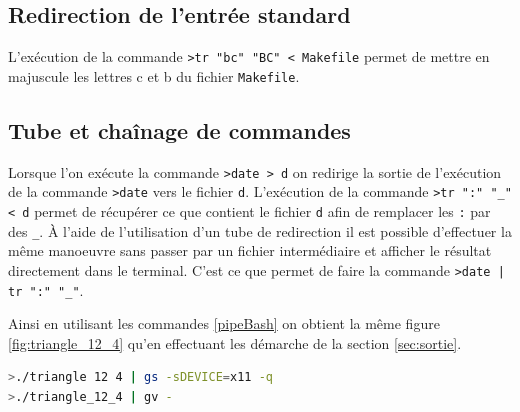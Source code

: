 \subsection{Redirection de l'entrée standard}
L'exécution de la commande \verb|>tr "bc" "BC" < Makefile| permet de mettre en majuscule les lettres c et b du fichier \verb|Makefile|. 

\subsection{Tube et chaînage de commandes}
\label{sec:tube}
Lorsque l'on exécute la commande \verb|>date > d| on redirige la sortie de l'exécution de la commande \verb|>date| vers le fichier \verb|d|.
L'exécution de la commande \verb|>tr ":" "_" < d| permet de récupérer ce que contient le fichier \verb|d| afin de remplacer les \verb|:| par des \verb|_|.
À l'aide de l'utilisation d'un tube de redirection il est possible d'effectuer la même manoeuvre sans passer par un fichier intermédiaire et afficher le résultat directement dans le terminal.
C'est ce que permet de faire la commande \verb!>date | tr ":" "_"!.

Ainsi en utilisant les commandes \ref{pipeBash} on obtient la même figure \ref{fig:triangle_12_4} qu'en effectuant les démarche de la section \ref{sec:sortie}.

\begin{lstlisting}[language=bash, label=pipeBash, caption=Tubes de redirection]
>./triangle 12 4 | gs -sDEVICE=x11 -q
>./triangle_12_4 | gv -
\end{lstlisting}













